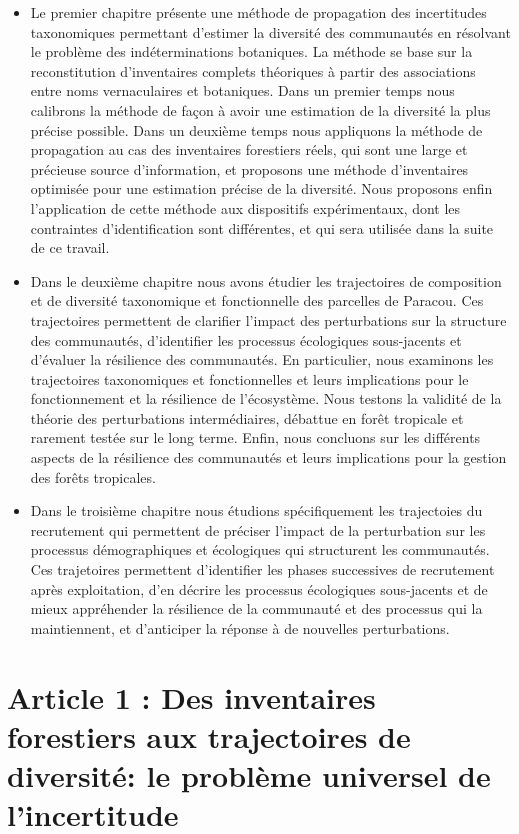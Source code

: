 \documentclass[
  11pt,
  french,
  A4paper,
  extrafontsizes,onecolumn,openright
  ]{memoir}
\begin{document}
\begin{itemize}
\item
  Le premier chapitre présente une méthode de propagation des
  incertitudes taxonomiques permettant d'estimer la diversité des
  communautés en résolvant le problème des indéterminations botaniques.
  La méthode se base sur la reconstitution d'inventaires complets
  théoriques à partir des associations entre noms vernaculaires et
  botaniques. Dans un premier temps nous calibrons la méthode de façon à
  avoir une estimation de la diversité la plus précise possible. Dans un
  deuxième temps nous appliquons la méthode de propagation au cas des
  inventaires forestiers réels, qui sont une large et précieuse source
  d'information, et proposons une méthode d'inventaires optimisée pour
  une estimation précise de la diversité. Nous proposons enfin
  l'application de cette méthode aux dispositifs expérimentaux, dont les
  contraintes d'identification sont différentes, et qui sera utilisée
  dans la suite de ce travail.
\item
  Dans le deuxième chapitre nous avons étudier les trajectoires de
  composition et de diversité taxonomique et fonctionnelle des parcelles
  de Paracou. Ces trajectoires permettent de clarifier l'impact des
  perturbations sur la structure des communautés, d'identifier les
  processus écologiques sous-jacents et d'évaluer la résilience des
  communautés. En particulier, nous examinons les trajectoires
  taxonomiques et fonctionnelles et leurs implications pour le
  fonctionnement et la résilience de l'écosystème. Nous testons la
  validité de la théorie des perturbations intermédiaires, débattue en
  forêt tropicale et rarement testée sur le long terme. Enfin, nous
  concluons sur les différents aspects de la résilience des communautés
  et leurs implications pour la gestion des forêts tropicales.
\item
  Dans le troisième chapitre nous étudions spécifiquement les
  trajectoies du recrutement qui permettent de préciser l'impact de la
  perturbation sur les processus démographiques et écologiques qui
  structurent les communautés. Ces trajetoires permettent d'identifier
  les phases successives de recrutement après exploitation, d'en décrire
  les processus écologiques sous-jacents et de mieux appréhender la
  résilience de la communauté et des processus qui la maintiennent, et
  d'anticiper la réponse à de nouvelles perturbations.
\end{itemize}

\chapter{Article 1 : Des inventaires forestiers aux trajectoires de
diversité: le problème universel de
l'incertitude}\label{article-1-des-inventaires-forestiers-aux-trajectoires-de-diversite-le-probleme-universel-de-lincertitude}
\end{document}
